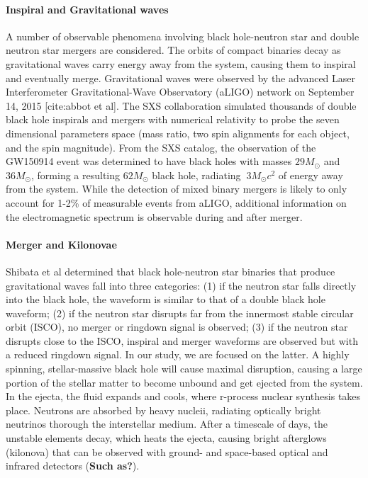 \paragraph{Inspiral and Gravitational waves}
A number of observable phenomena involving black hole-neutron star and double neutron star mergers are considered.  
The orbits of compact binaries decay as gravitational waves carry energy away from the system, causing them to inspiral and eventually merge.  Gravitational waves were observed by the advanced Laser Interferometer Gravitational-Wave Observatory (aLIGO) network on September 14, 2015 [cite:abbot et al]. 
The SXS collaboration simulated thousands of double black hole inspirals and mergers with numerical relativity to probe the seven dimensional parameters space (mass ratio, two spin alignments for each object, and the spin magnitude).  From the SXS catalog, the observation of the GW150914 event was determined to have black holes with masses $29 M_\odot$ and $36 M_\odot$, forming a resulting $62 M_\odot$ black hole, radiating $~3 M_\odot c^2$ of energy away from the system.
While the detection of mixed binary mergers is likely to only account for 1-2\% of measurable events from aLIGO, additional information on the electromagnetic spectrum is observable during and after merger. 

\paragraph{Merger and Kilonovae}
Shibata et al determined that black hole-neutron star binaries that produce gravitational waves fall into three categories: (1) if the neutron star falls directly into the black hole, the waveform is similar to that of a double black hole waveform; (2) if the neutron star disrupts far from the innermost stable circular orbit (ISCO), no merger or ringdown signal is observed; (3) if the neutron star disrupts close to the ISCO, inspiral and merger waveforms are observed but with a reduced ringdown signal.
In our study, we are focused on the latter. 
A highly spinning, stellar-massive black hole will cause maximal disruption, causing a large portion of the stellar matter to become unbound and get ejected from the system.
In the ejecta, the fluid expands and cools, where r-process nuclear synthesis takes place.  Neutrons are absorbed by heavy nucleii, radiating optically bright neutrinos thorough the interstellar medium. 
After a timescale of days, the unstable elements decay, which heats the ejecta, causing bright afterglows (kilonova) that can be observed with ground- and space-based optical and infrared detectors (\textbf{Such as?}).

